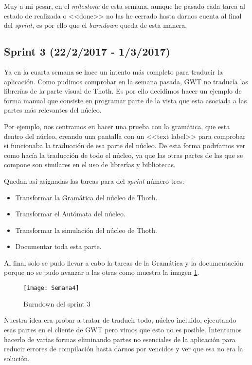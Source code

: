 Muy a mi pesar, en el \emph{milestone} de esta semana, aunque he pasado cada tarea al estado de realizada o <<done>> no las he cerrado hasta darnos cuenta al final del \emph{sprint}, es por ello que el \emph{burndown} queda de esta manera.


\subsection{Sprint 3 (22/2/2017 - 1/3/2017)}

Ya en la cuarta semana se hace un intento más completo para traducir la aplicación. Como pudimos comprobar en la semana pasada, GWT no traducía las librerías de la parte visual de Thoth. Es por ello decidimos hacer un ejemplo de forma manual que consiste en programar parte de la vista que esta asociada a las partes más relevantes del núcleo.

Por ejemplo, nos centramos en hacer una prueba con la gramática, que esta dentro del núcleo, creando una pantalla con un <<text label>> para comprobar si funcionaba la traducción de esa parte del núcleo. De esta forma podríamos ver como hacía la traducción de todo el núcleo, ya que las otras partes de las que se compone son similares en el uso de librerías y bibliotecas.

Quedan así asignadas las tareas para del \emph{sprint} número tres:

\begin{itemize}
\item Transformar la Gramática del núcleo de Thoth.
\item Transformar el Autómata del núcleo.
\item Transformar la simulación del núcleo de Thoth.
\item Documentar toda esta parte.
\end{itemize}

Al final solo se pudo llevar a cabo la tareas de la Gramática y la documentación porque no se pudo avanzar a las otras como muestra la imagen \ref{fig:A.2}.

\begin{figure}[h]
\centering
\texttt{[image: Semana4]}
\caption{Burndown del sprint 3}
\label{fig:A.2}
\end{figure}

 Nuestra idea era probar a tratar de traducir todo, núcleo incluido, ejecutando esas partes en el cliente de GWT  pero vimos que esto no es posible. Intentamos hacerlo de varias formas eliminando partes no esenciales de la aplicación para reducir errores de compilación hasta darnos por vencidos y ver que esa no era la solución.

